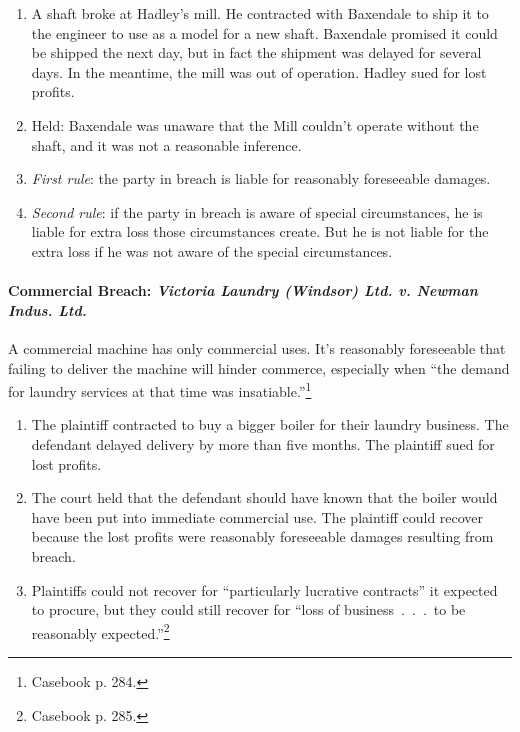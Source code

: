 \begin{enumerate}
    \item A shaft broke at Hadley's mill. He contracted with Baxendale to ship 
    it to the engineer to use as a model for a new shaft. Baxendale promised 
    it could be shipped the next day, but in fact the shipment was delayed for 
    several days. In the meantime, the mill was out of operation. Hadley sued 
    for lost profits.
    \item Held: Baxendale was unaware that the Mill couldn't operate without 
    the shaft, and it was not a reasonable inference.
    \item \emph{First rule}: the party in breach is liable for reasonably 
    foreseeable damages.
    \item \emph{Second rule}: if the party in breach is aware of special 
    circumstances, he is liable for extra loss those circumstances create. But 
    he is not liable for the extra loss if he was not aware of the special 
    circumstances.
\end{enumerate}

\paragraph{Commercial Breach: \emph{Victoria Laundry (Windsor) Ltd. v. Newman 
Indus. Ltd.}}

A commercial machine has only commercial uses. It's reasonably foreseeable 
that failing to deliver the machine will hinder commerce, especially when 
``the demand for laundry services at that time was 
insatiable.''\footnote{Casebook p. 284.}

\begin{enumerate}
    \item The plaintiff contracted to buy a bigger boiler for their laundry 
    business. The defendant delayed delivery by more than five months. The 
    plaintiff sued for lost profits.
    \item The court held that the defendant should have known that the boiler 
    would have been put into immediate commercial use. The plaintiff could 
    recover because the lost profits were reasonably foreseeable damages 
    resulting from breach.
    \item Plaintiffs could not recover for ``particularly lucrative 
    contracts'' it expected to procure, but they could still recover for 
    ``loss of business~.~.~.~to be reasonably expected.''\footnote{Casebook p. 
    285.}
\end{enumerate}

